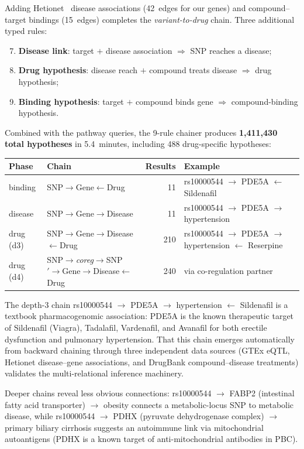 \documentclass[11pt,openany]{report}
\begin{document}
Adding Hetionet~\cite{Himmelstein2017Rephetio} disease associations (42~edges
for our genes) and compound--target bindings (15~edges) completes the
\emph{variant-to-drug} chain.  Three additional typed rules:
\begin{enumerate}
\setcounter{enumi}{6}
\item \textbf{Disease link}: target $+$ disease association
  $\Rightarrow$ SNP reaches a disease;
\item \textbf{Drug hypothesis}: disease reach $+$ compound treats
  disease $\Rightarrow$ drug hypothesis;
\item \textbf{Binding hypothesis}: target $+$ compound binds gene
  $\Rightarrow$ compound-binding hypothesis.
\end{enumerate}

\noindent
Combined with the pathway queries, the 9-rule chainer produces
\textbf{1{,}411{,}430 total hypotheses} in 5.4~minutes, including
488 drug-specific hypotheses:

\begin{center}
\begin{tabular}{llrl}
\toprule
Phase & Chain & Results & Example \\
\midrule
binding   & SNP$\to$Gene$\leftarrow$Drug & 11
  & rs10000544 $\to$ PDE5A $\leftarrow$ Sildenafil \\
disease   & SNP$\to$Gene$\to$Disease & 11
  & rs10000544 $\to$ PDE5A $\to$ hypertension \\
drug (d3) & SNP$\to$Gene$\to$Disease$\leftarrow$Drug & 210
  & rs10000544 $\to$ PDE5A $\to$ hypertension $\leftarrow$ Reserpine \\
drug (d4) & SNP$\to$\textit{coreg}$\to$SNP$'\to$Gene$\to$Disease$\leftarrow$Drug & 240
  & via co-regulation partner \\
\bottomrule
\end{tabular}
\end{center}

\noindent
The depth-3 chain rs10000544 $\to$ PDE5A $\to$ hypertension
$\leftarrow$ Sildenafil is a textbook pharmacogenomic association:
PDE5A is the known therapeutic target of Sildenafil (Viagra),
Tadalafil, Vardenafil, and Avanafil for both erectile dysfunction
and pulmonary hypertension.  That this chain emerges automatically
from backward chaining through three independent data sources
(GTEx eQTL, Hetionet disease--gene associations, and DrugBank
compound--disease treatments) validates the multi-relational
inference machinery.

Deeper chains reveal less obvious connections: rs10000544 $\to$
FABP2 (intestinal fatty acid transporter) $\to$ obesity connects a
metabolic-locus SNP to metabolic disease, while rs10000544 $\to$
PDHX (pyruvate dehydrogenase complex) $\to$ primary biliary
cirrhosis suggests an autoimmune link via mitochondrial
autoantigens (PDHX is a known target of anti-mitochondrial
antibodies in PBC\@).
\end{document}
